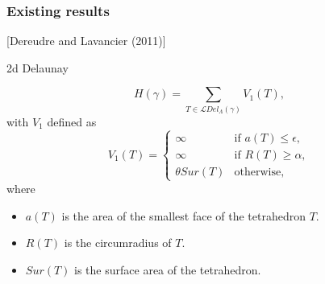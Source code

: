 \documentclass[c, 10pt]{beamer}
\begin{document}
\begin{frame}\frametitle{Existing results}
[Dereudre and Lavancier (2011)]

2d Delaunay


$$H(\gamma)= \sum_{T \in \mathcal LDel_\Lambda(\gamma)} V_1(T),$$ 
with $V_1$ defined as
\begin{equation}
V_1(T) = 
\left\{
    \begin{array}{ll}
        \infty & \mbox{if } a(T)\leq \epsilon, \\
        \infty & \mbox{if } R(T)\geq \alpha, \\
        \theta Sur(T) & \mbox{otherwise, }
    \end{array}
\right. 
\end{equation}
where
\begin{itemize}
\item $a(T)$ is the area of the smallest face of the tetrahedron $T$.
\item $R(T)$ is the circumradius of $T$.
\item $Sur(T)$ is the surface area of the tetrahedron.
\end{itemize}







\end{frame}
\end{document}
